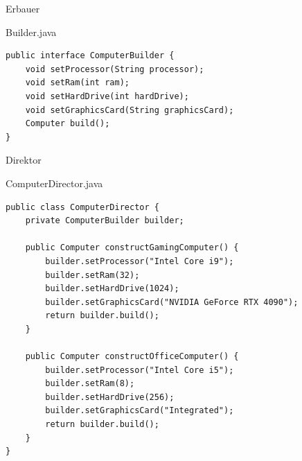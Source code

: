 \begin{frame}[fragile]{Erbauer}
	\begin{exampleblock}{Builder.java}
 		\begin{lstlisting}
public interface ComputerBuilder {
	void setProcessor(String processor);
	void setRam(int ram);
	void setHardDrive(int hardDrive);
	void setGraphicsCard(String graphicsCard);
	Computer build();
}
 		\end{lstlisting}
 	\end{exampleblock}
\end{frame}

\begin{frame}[fragile]{Direktor}
	\begin{exampleblock}{ComputerDirector.java}
 		\begin{lstlisting}
public class ComputerDirector {
    private ComputerBuilder builder;

    public Computer constructGamingComputer() {
    	builder.setProcessor("Intel Core i9");
    	builder.setRam(32);
    	builder.setHardDrive(1024);
    	builder.setGraphicsCard("NVIDIA GeForce RTX 4090");
        return builder.build();
    }

    public Computer constructOfficeComputer() {
    	builder.setProcessor("Intel Core i5");
    	builder.setRam(8);
    	builder.setHardDrive(256);
        builder.setGraphicsCard("Integrated");
        return builder.build();
    }
}    
 		\end{lstlisting}
 	\end{exampleblock}
\end{frame}


